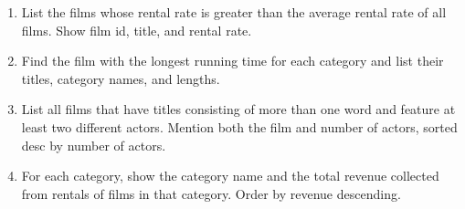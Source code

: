 \documentclass[12pt,a4paper]{article}
\newif\ifshowsolutions
\begin{document}
\begin{enumerate}




\item List the films whose rental rate is greater than the average rental rate of all films. Show film id, title, and rental rate.

\ifshowsolutions
\begin{lstlisting}[language=SQL]
SELECT film_id, title, rental_rate
FROM film
WHERE rental_rate > (
    SELECT AVG(rental_rate)
    FROM film
)
ORDER BY rental_rate DESC;
\end{lstlisting}
\fi
\item Find the film with the longest running time for each category and list their titles, category names, and lengths.
\ifshowsolutions
\begin{lstlisting}[language=SQL]
SELECT DISTINCT ON (c.category_id)
    c.name AS category_name,
    f.title,
    f.length
FROM category c
JOIN film_category fc ON c.category_id = fc.category_id
JOIN film f ON fc.film_id = f.film_id
ORDER BY c.category_id, f.length DESC;
\end{lstlisting}
\fi
\item List all films that have titles consisting of more than one word and feature at least two different actors. Mention both the film and number of actors, sorted desc by number of actors.
\ifshowsolutions
\begin{lstlisting}[language=SQL]
SELECT f.title,
       COUNT(DISTINCT fa.actor_id) AS actor_count
FROM film f
JOIN film_actor fa ON f.film_id = fa.film_id
WHERE f.title LIKE '% %'
GROUP BY f.film_id, f.title
HAVING COUNT(DISTINCT fa.actor_id) >= 2
ORDER BY actor_count DESC, f.title;
\end{lstlisting}
\fi
\item For each category, show the category name and the total revenue collected from rentals of films in that category. Order by revenue descending.


\end{enumerate}
\end{document}
